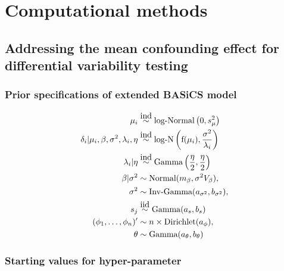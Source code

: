 
\chapter{Computational methods} 

\section{Addressing the mean confounding effect for differential variability testing}
\label{appB.1}

\subsection{Prior specifications of extended BASiCS model}

\begin{align*}
\mu_i &\stackrel{\mbox{ind}}{\sim} \mbox{log-Normal}\left(0, s^2_{\mu}\right) \\
\delta_i| \mu_i,\beta,\sigma^2, \lambda_i, \eta &\stackrel{\mbox{ind}}{\sim} \text{log-N}\left( \text{f}(\mu_i),\frac{\sigma^2}{\lambda_i} \right)\\
\lambda_i|\eta &\stackrel{\mbox{ind}}{\sim} \text{Gamma}\left(\frac{\eta}{2},\frac{\eta}{2}\right)\\
\beta|\sigma^2 & \sim \textnormal{Normal}(m_\beta,\sigma^2V_\beta),\\
\sigma^2 & \sim  \textnormal{Inv-Gamma}(a_{\sigma^2},b_{\sigma^2}),\\
s_j & \stackrel{\mbox{iid}}{\sim}  \textnormal{Gamma}(a_s,b_s) \\
(\phi_1, \ldots, \phi_n)' & \sim  n \times \textnormal{Dirichlet}(a_\phi),\\
\theta & \sim  \textnormal{Gamma}(a_\theta,b_\theta)
\end{align*}

\subsection{Starting values for hyper-parameter}
\label{appB.1.hyper}

